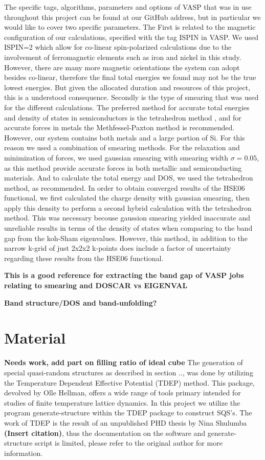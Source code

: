 The specific tags, algorithms, parameters and options of VASP that was in use throughout this project can be found at our GitHub address, but in particular we would like to cover two specific parameters. The First is related to the magnetic configuration of our calculations, specified with the tag ISPIN in VASP. We used ISPIN=2 which allow for co-linear spin-polarized calculations due to the involvement of ferromagnetic elements such as iron and nickel in this study. However, there are many more magnetic orientations the system can adopt besides co-linear, therefore the final total energies we found may not be the true lowest energies. But given the allocated duration and resources of this project, this is a understood consequence. Secondly is the type of smearing that was used for the different calculations. The preferred method for accurate total energies and density of states in semiconductors is the tetrahedron method \cite{ismear5}, and for accurate forces in metals the Methfessel-Paxton method is recommended. However, our system contains both metals and a large portion of Si. For this reason we used a combination of smearing methods. For the relaxation and minimization of forces, we used gaussian smearing with smearing width $\sigma = 0.05$, as this method provide accurate forces in both metallic and semiconducting materials. And to calculate the total energy and DOS, we used the tetrahedron method, as recommended. In order to obtain converged results of the HSE06 functional, we first calculated the charge density with gaussian smearing, then apply this density to perform a second hybrid calculation with the tetrahedron method. This was necessary becouse gaussion smearing yielded inaccurate and unreliable results in terms of the density of states when comparing to the band gap from the koh-Sham eigenvalues. However, this method, in addition to the narrow k-grid of just 2x2x2 k-points does include a factor of uncertainty regarding these results from the HSE06 functional. 


\textbf{This \cite{bandgap_vasp_forum} is a good reference for extracting the band gap of VASP jobs relating to smearing and DOSCAR vs EIGENVAL}

\textbf{Band structure/DOS and band-unfolding?}

\section{Material}
\textbf{Needs work, add part on filling ratio of ideal cube}
The generation of special quasi-random structures as described in section .., was done by utilizing the Temperature Dependent Effective Potential (TDEP) method. This package, devolved by Olle Hellman, offers a wide range of tools primary intended for studies of finite temperature lattice dynamics. In this project we utilize the program generate-structure within the TDEP package to construct SQS's. The work of TDEP is the result of an unpublished PHD thesis by Nina Shulumba \textbf{(Insert citation)}, thus the documentation on the software and generate-structure script is limited, please refer to the original author for more information. 

